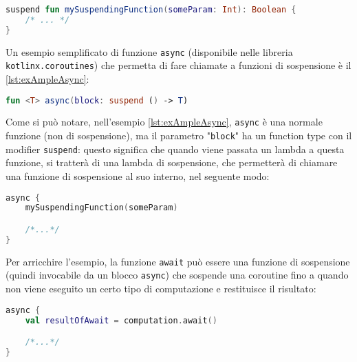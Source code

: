 \begin{lstlisting}[caption={Definizione di una funzione di sospensione}, captionpos=b, label={lst:exAmpleSusp}, language=Kotlin]
suspend fun mySuspendingFunction(someParam: Int): Boolean {
    /* ... */
}
\end{lstlisting}

Un esempio semplificato di funzione \texttt{async} (disponibile nelle libreria \texttt{kotlinx.coroutines}) che permetta di fare chiamate a funzioni di sospensione è il \ref{lst:exAmpleAsync}:\\

\begin{lstlisting}[caption={Semplificazione della definizione della funzione di libreria \texttt{async}}, captionpos=b, label={lst:exAmpleAsync}, language=Kotlin]
fun <T> async(block: suspend () -> T)
\end{lstlisting}

Come si può notare, nell'esempio \ref{lst:exAmpleAsync}, \texttt{async} è una normale funzione (non di sospensione), ma il parametro "\texttt{block}" ha un function type con il modifier \texttt{suspend}: questo significa che quando viene passata un lambda a questa funzione, si tratterà di una lambda di sospensione, che permetterà di chiamare una funzione di sospensione al suo interno, nel seguente modo:\\

\begin{lstlisting}[caption={Utilizzo della funzione \texttt{async}}, captionpos=b, label={lst:exAmpleAsyncCall}, language=Kotlin]
async {
    mySuspendingFunction(someParam)

    /*...*/
}
\end{lstlisting}

Per arricchire l'esempio, la funzione \texttt{await} può essere una funzione di sospensione (quindi invocabile da un blocco \texttt{async{}}) che sospende una coroutine fino a quando non viene eseguito un certo tipo di computazione e restituisce il risultato:\\

\begin{lstlisting}[caption={Combinazione \texttt{async / await}}, captionpos=b, label={lst:exAmpleAwait}, language=Kotlin]
async {
    val resultOfAwait = computation.await()

    /*...*/
}
\end{lstlisting}


